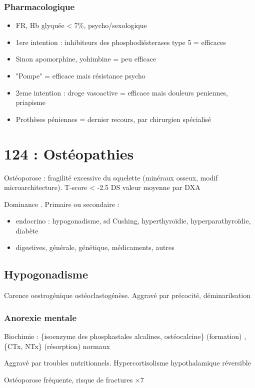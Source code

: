 \documentclass[11pt]{article}
\begin{document}
\subsubsection{Pharmacologique}
\label{sec:org4b6a427}
\begin{itemize}
\item FR, Hb glyquée < 7\%, psycho/sexologique
\item 1ere intention : inhibiteurs des phosphodiésterases type 5 = efficaces
\item Sinon apomorphine, yohimbine = peu efficace
\item "Pompe" = efficace mais résistance psycho
\item 2eme intention : droge vasoactive = efficace mais douleurs peniennes, priapisme
\item Prothèses péniennes = dernier recours, par chirurgien spécialisé
\end{itemize}

\section{124 : Ostéopathies}
\label{sec:org5ade99b}
Ostéoporose : fragilité excessive du squelette (\dec minéraux osseux, modif
microarchitecture). T-score < -2.5 DS valeur moyenne par DXA

Dominance \female. Primaire ou secondaire :
\begin{itemize}
\item endocrino : hypogonadisme, sd Cushing, hyperthyroïdie, hyperparathyroïdie, diabète
\item digestives, générale, génétique, médicaments, autres
\end{itemize}

\subsection{Hypogonadisme}
\label{sec:orgc01abb7}
Carence oestrogénique \inc ostéoclastogénèse. Aggravé par précocité,
déminarilsation
\subsubsection{Anorexie mentale}
\label{sec:orgba8cdfd}
Biochimie : \{isoenzyme des phosphastales alcalines, ostéocalcine\} (formation)
\dec, \{CTx, NTx\} (résorption) normaux

Aggravé par troubles nutritionnels. Hypercortisolisme hypothalamique réversible

Ostéoporose fréquente, risque de fractures \(\times 7\)
\end{document}
